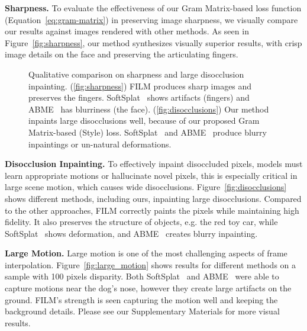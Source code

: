 \documentclass[runningheads]{llncs}
\begin{document}
\vspace{0.05in}
\noindent\textbf{Sharpness.} To evaluate the effectiveness of our Gram Matrix-based loss function (Equation~\ref{eq:gram-matrix}) in preserving image sharpness, we visually compare our results against images rendered with other methods.
As seen in Figure~\ref{fig:sharpness}, our method synthesizes visually superior results, with crisp image details on the face and preserving the articulating fingers.
\begin{figure}[t!]
    \centering
    \enspace
    \caption{Qualitative comparison on sharpness and large disocclusion inpainting. (\ref{fig:sharpness}) FILM produces sharp images and preserves the fingers. SoftSplat~\cite{softsplat-2020} shows artifacts (fingers) and ABME~\cite{abme-2021} has blurriness (the face). (\ref{fig:disocclusions}) Our method inpaints large disocclusions well, because of our proposed Gram Matrix-based (Style) loss. SoftSplat~\cite{softsplat-2020} and ABME~\cite{abme-2021} produce blurry inpaintings or un-natural deformations. }\label{fig:qualitative}\end{figure}

\vspace{0.05in}
\noindent\textbf{Disocclusion Inpainting.} To effectively inpaint disoccluded pixels, models must learn appropriate motions or hallucinate novel pixels, this is especially critical in large scene motion, which causes wide disocclusions. Figure~\ref{fig:disocclusions} shows different methods, including ours, inpainting large disocclusions. Compared to the other approaches, FILM correctly paints the pixels while maintaining high fidelity. It also preserves the structure of objects, e.g. the red toy car, while SoftSplat~\cite{softsplat-2020} shows deformation, and ABME~\cite{abme-2021} creates blurry inpainting.

\vspace{0.05in}
\noindent\textbf{Large Motion.} Large motion is one of the most challenging aspects of frame interpolation. Figure~\ref{fig:large_motion} shows results for different methods on a sample with 100 pixels disparity. Both SoftSplat~\cite{softsplat-2020} and ABME~\cite{abme-2021} were able to capture motions near the dog's nose, however they create large artifacts on the ground. FILM's strength is seen capturing the motion well and keeping the background details. Please see our Supplementary Materials for more visual results. 
\end{document}
